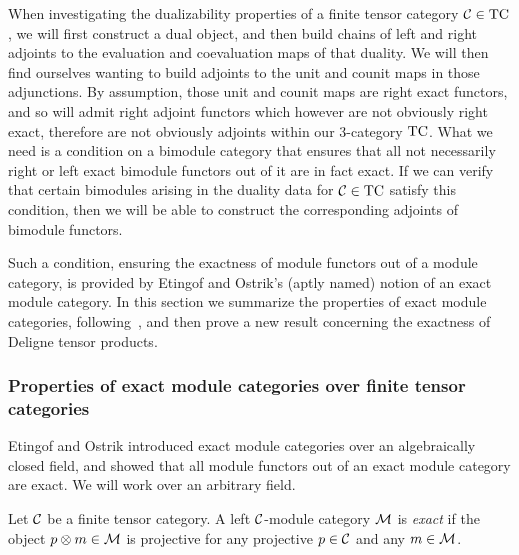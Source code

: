 \documentclass{amsart}
\begin{document}
When investigating the dualizability properties of a finite tensor category $\mathcal C \in \mathrm{TC}$, we will first construct a dual object, and then build chains of left and right adjoints to the evaluation and coevaluation maps of that duality.  We will then find ourselves wanting to build adjoints to the unit and counit maps in those adjunctions.  By assumption, those unit and counit maps are right exact functors, and so will admit right adjoint functors which however are not obviously right exact, therefore are not obviously adjoints within our 3-category $\mathrm{TC}$.  What we need is a condition on a bimodule category that ensures that all not necessarily right or left exact bimodule functors out of it are in fact exact.  If we can verify that certain bimodules arising in the duality data for $\mathcal C \in \mathrm{TC}$ satisfy this condition, then we will be able to construct the corresponding adjoints of bimodule functors.

Such a condition, ensuring the exactness of module functors out of a module category, is provided by Etingof and Ostrik's (aptly named) notion of an exact module category.  In this section we summarize the properties of exact module categories, following~\cite{EO-ftc}, and then prove a new result concerning the exactness of Deligne tensor products.


\subsubsection{Properties of exact module categories over finite tensor categories}

Etingof and Ostrik introduced exact module categories over an algebraically closed field, and showed that all module functors out of an exact module category are exact.  We will work over an arbitrary field. 

\begin{definition}
Let $\mathcal C$ be a finite tensor category.  A left $\mathcal C$-module category $\mathcal M$ is \emph{exact} 
if the object $p \otimes m \in \mathcal M$ is projective for any projective $p \in \mathcal C$ and any $m \in \mathcal M$.
\end{definition}
\end{document}
